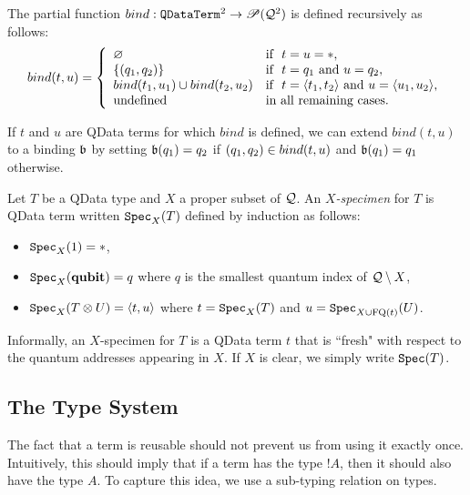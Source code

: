 \documentclass[twoside]{article}
\begin{document}
\begin{definition}
The partial function $bind: \texttt{QDataTerm}^2\to {\mathscr{P}} (\mathcal{Q}^2)$ is 
defined recursively as follows:
\[
bind (t,u)= \left\{
  \begin{array}{ll}
    \varnothing & \mbox{if}~~ t=u=*, \\
    \{(q_1,q_2)\} & \mbox{if}~~ t=q_1 \mbox{ and } u=q_2, \\        
    bind (t_1,u_1) \cup bind (t_2,u_2) & 
      \mbox{if}~~ t=\langle t_1,t_2\rangle \mbox{ and } u=\langle u_1,u_2\rangle, \\
    \mbox{undefined} & \mbox{in all remaining cases.}
  \end{array}
\right.
\]
\end{definition}

\begin{remark}
\label{bind_extension}
If $t$ and $u$ are QData terms for which $bind$ is defined, we 
can extend $bind(t,u)$ to a binding $\mathfrak{b}$ by setting 
$\mathfrak{b} (q_1) = q_2$ if $(q_1,q_2)\in bind (t,u)$ and 
$\mathfrak{b} (q_1) = q_1$ otherwise.
\end{remark}

\begin{definition}
Let $T$ be a QData type and $X$ a proper subset of $\mathcal{Q}$. 
An \emph{$X$-specimen} for $T$ is QData term written $\texttt{Spec}_X(T)$ 
defined by induction as follows:
\begin{itemize}
  \item $\texttt{Spec}_X(1)=*$,
  \item $\texttt{Spec}_X(\textrm{\bf qubit})=q$ where $q$ is the smallest quantum 
  index of $\mathcal{Q}\setminus X$,
  \item $\texttt{Spec}_X(T\otimes U)=\langle t,u\rangle$ where $t=\texttt{Spec}_X(T)$ 
  and $u=\texttt{Spec}_{X\cup \mathop{\textrm{FQ}}\nolimits(t)}(U)$.  
\end{itemize}
\end{definition}


Informally, an $X$-specimen for $T$ is a QData term $t$ that is 
``fresh" with respect to the quantum addresses appearing in $X$.
If $X$ is clear, we simply write $\texttt{Spec} (T)$.


\subsection{The Type System}

The fact that a term is reusable should not prevent us from 
using it exactly once. Intuitively, this should imply that if a 
term has the type $!A$, then it should also have the type $A$. 
To capture this idea, we use a sub-typing relation on types.
\end{document}
